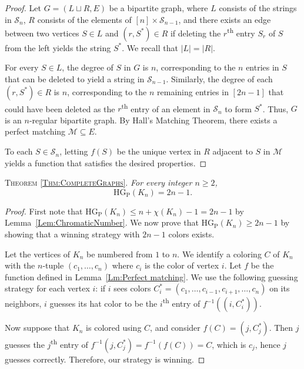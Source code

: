 \documentclass[a4paper,11pt]{amsproc}
\theoremstyle{plain}
\theoremstyle{definition}
\newcommand{\HGP}{\mathrm{HG_{P}}}
\renewcommand{\th}{\textsuperscript{th} }
\begin{document}
\begin{proof}

    Let $G = (L \sqcup R, E)$ be a bipartite graph, where $L$ consists of the strings in $\mathcal{S}_n$, $R$ consists of the elements of $[n] \times \mathcal{S}_{n-1}$, and there exists an edge between two vertices $S \in L$ and $(r, S^*) \in R$ if deleting the $r$\th entry $S_r$ of $S$ from the left yields the string $S^*$. We recall that $|L| = |R|$.
\newline

    For every $S \in L$, the degree of $S$ in $G$ is $n$, corresponding to the $n$ entries in $S$ that can be deleted to yield a string in $\mathcal{S}_{n-1}$. Similarly, the degree of each $(r, S^*) \in R$ is $n$, corresponding to the $n$ remaining entries in $[2n-1]$ that could have been deleted as the $r$\th entry of an element in $\mathcal{S}_n$ to form $S^*$. Thus, $G$ is an $n$-regular bipartite graph. By Hall's Matching Theorem, there exists a perfect matching $\mathcal{M} \subseteq E$.  
\newline

    To each $S \in \mathcal{S}_n$, letting $f(S)$ be the unique vertex in $R$ adjacent to $S$ in $\mathcal{M}$ yields a function that satisfies the desired properties. 
\end{proof}

{\scshape Theorem \ref{Thm:CompleteGraphs}.}
 {\it For every integer $n \geq 2$,
 \[\HGP(K_n) = 2n - 1.\]}

\begin{proof}
First note that $\HGP(K_n) \leq n + \chi(K_n) - 1 = 2n-1$ by Lemma~\ref{Lem:ChromaticNumber}.
We now prove that $\HGP(K_n) \geq 2n-1$ by showing that a winning strategy with $2n - 1$ colors exists. 

Let the vertices of $K_n$ be numbered from $1$ to $n$.
We identify a coloring $C$ of $K_n$ with the $n$-tuple $(c_1,\dots,c_n)$ where $c_i$ is the color of vertex $i$.
Let $f$ be the function defined in Lemma~\ref{Lm:Perfect matching}.
We use the following guessing strategy for each vertex $i$: if $i$ sees colors $C^*_i = (c_1,\dots,c_{i-1},c_{i+1},\dots,c_n)$ on its neighbors, $i$ guesses its hat color to be the $i$\textsuperscript{th} entry of $f^{-1}((i,C^*_i))$.

Now suppose that $K_n$ is colored using $C$, and consider $f(C) = (j, C^*_j)$.
Then $j$ guesses the $j$\textsuperscript{th} entry of $f^{-1}(j,C^*_j) = f^{-1}(f(C)) = C$, which is $c_j$, hence $j$ guesses correctly.
Therefore, our strategy is winning.
\end{proof}
\end{document}
